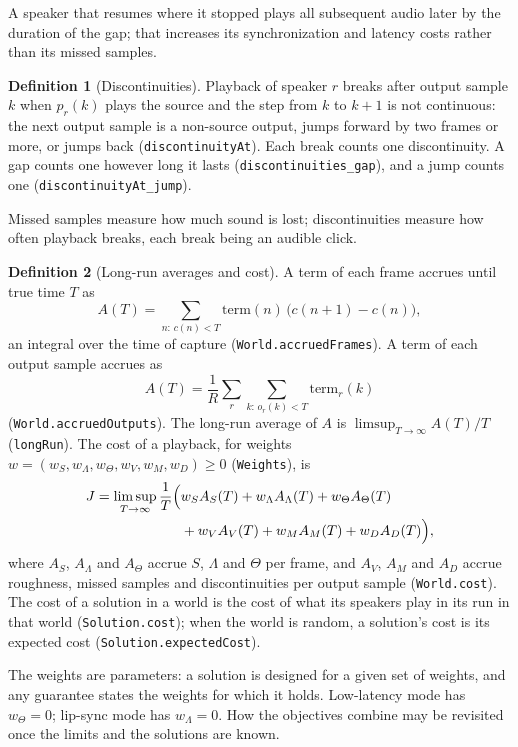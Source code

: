 \documentclass[11pt,a4paper]{article}
\newcommand{\lean}[1]{\texttt{#1}}
\theoremstyle{definition}
\newtheorem{definition}{Definition}[section]
\begin{document}
A speaker that resumes where it stopped plays all subsequent audio later by
the duration of the gap; that increases its synchronization and latency
costs rather than its missed samples.

\begin{definition}[Discontinuities]
Playback of speaker $r$ breaks after output sample $k$ when $p_r(k)$ plays
the source and the step from $k$ to $k+1$ is not continuous: the next output
sample is a non-source output, jumps forward by two frames or more, or jumps
back (\lean{discontinuityAt}). Each break counts one discontinuity. A gap
counts one however long it lasts (\lean{discontinuities\_gap}), and a jump
counts one (\lean{discontinuityAt\_jump}).
\end{definition}

Missed samples measure how much sound is lost; discontinuities measure how
often playback breaks, each break being an audible click.

\begin{definition}[Long-run averages and cost]
A term of each frame accrues until true time $T$ as
\[
  A(T) = \sum_{n:\,c(n) < T} \mathrm{term}(n)\,\bigl(c(n+1) - c(n)\bigr),
\]
an integral over the time of capture (\lean{World.accruedFrames}). A term
of each output sample accrues as
\[
  A(T) = \frac{1}{R}\sum_r \sum_{k:\,o_r(k) < T} \mathrm{term}_r(k)
\]
(\lean{World.accruedOutputs}). The long-run average of $A$ is
$\limsup_{T \to \infty} A(T)/T$ (\lean{longRun}). The cost of a playback,
for weights $w = (w_S, w_\Lambda, w_\Theta, w_V, w_M, w_D) \ge 0$
(\lean{Weights}), is
\[
\begin{aligned}
  J = \limsup_{T \to \infty} \frac{1}{T}\Bigl(
      &w_S A_S(T) + w_\Lambda A_\Lambda(T) + w_\Theta A_\Theta(T) \\
    &+ w_V A_V(T) + w_M A_M(T) + w_D A_D(T) \Bigr),
\end{aligned}
\]
where $A_S$, $A_\Lambda$ and $A_\Theta$ accrue $S$, $\Lambda$ and $\Theta$
per frame, and $A_V$, $A_M$ and $A_D$ accrue roughness, missed samples and
discontinuities per output sample (\lean{World.cost}). The cost of a
solution in a world is the cost of what its speakers play in its run in that
world (\lean{Solution.cost}); when the world is random, a solution's cost is
its expected cost (\lean{Solution.expectedCost}).
\end{definition}

The weights are parameters: a solution is designed for a given set of
weights, and any guarantee states the weights for which it holds.
Low-latency mode has $w_\Theta = 0$; lip-sync mode has $w_\Lambda = 0$. How
the objectives combine may be revisited once the limits and the solutions
are known.
\end{document}
